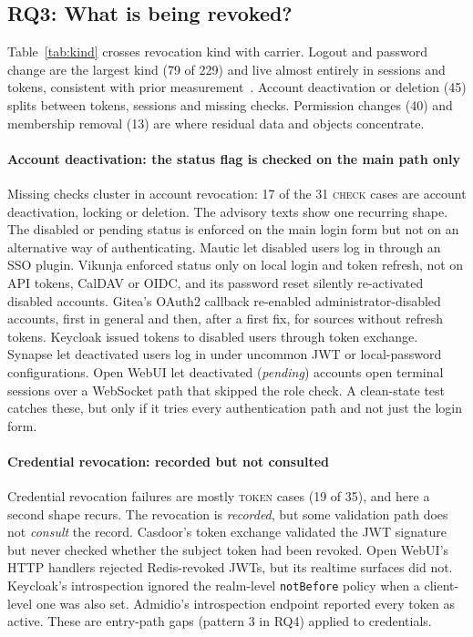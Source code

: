 \documentclass[preprint,12pt]{elsarticle}
\begin{document}
\subsection{RQ3: What is being revoked?}
Table~\ref{tab:kind} crosses revocation kind with carrier. Logout and password change are the largest kind
(79 of 229) and live almost entirely in sessions and tokens, consistent with prior measurement~\cite{loginplus}.
Account deactivation or deletion (45) splits between tokens, sessions and missing checks. Permission changes (40)
and membership removal (13) are where residual data and objects concentrate.

\begin{table}[t]
\centering\small
\caption{Revocation kind by carrier (all 229 cases).}
\label{tab:kind}
\resizebox{\linewidth}{!}{}
\end{table}

\paragraph{Account deactivation: the status flag is checked on the main path only}
Missing checks cluster in account revocation: 17 of the 31 \textsc{check} cases are account deactivation, locking or
deletion. The advisory texts show one recurring shape. The disabled or pending status is enforced on the main
login form but not on an alternative way of authenticating. Mautic let disabled users log in through an SSO plugin.
Vikunja enforced status only on local login and token refresh, not on API tokens, CalDAV or OIDC, and its password
reset silently re-activated disabled accounts. Gitea's OAuth2 callback re-enabled administrator-disabled accounts,
first in general and then, after a first fix, for sources without refresh tokens. Keycloak issued tokens to disabled
users through token exchange. Synapse let deactivated users log in under uncommon JWT or local-password
configurations. Open WebUI let deactivated (\emph{pending}) accounts open terminal sessions over a WebSocket path that
skipped the role check. A clean-state test catches these, but only if it tries every authentication path and not just
the login form.

\paragraph{Credential revocation: recorded but not consulted}
Credential revocation failures are mostly \textsc{token} cases (19 of 35), and here a second shape recurs. The
revocation is \emph{recorded}, but some validation path does not \emph{consult} the record. Casdoor's token exchange
validated the JWT signature but never checked whether the subject token had been revoked. Open WebUI's HTTP handlers
rejected Redis-revoked JWTs, but its realtime surfaces did not. Keycloak's introspection ignored the realm-level
\texttt{notBefore} policy when a client-level one was also set. Admidio's introspection endpoint reported every token as
active. These are entry-path gaps (pattern 3 in RQ4) applied to credentials.
\end{document}
